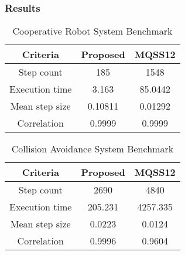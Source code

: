 \begin{frame} \frametitle{Results}
	\begin{table}[]
		\begin{tabular}{ccc}
			\toprule
			Criteria 	    & Proposed & MQSS12 	\\ \midrule
			Step count      & 	185		&  1548 	\\
			Execution time  &   3.163    & 85.0442  \\
			Mean step size  &	0.10811  & 0.01292  \\
			Correlation     &   0.9999   & 0.9999   \\ \bottomrule
		\end{tabular}
		\caption{Cooperative Robot System Benchmark }
	\end{table}
	
	\begin{table}[]
		\begin{tabular}{ccc}
			\toprule
			Criteria 	    & Proposed & MQSS12 	\\ \midrule
			Step count      & 	2690	&  4840 	\\
			Execution time  &   205.231  & 4257.335  \\
			Mean step size  &	0.0223  & 0.0124  \\
			Correlation     &   0.9996   & 0.9604   \\ \bottomrule
		\end{tabular}
		\caption{Collision Avoidance System Benchmark }
	\end{table}
\end{frame}

